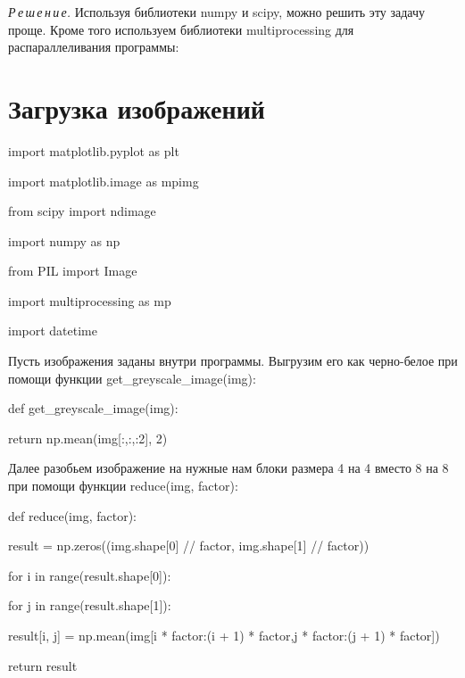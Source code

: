 \documentclass{article}
\begin{document}
 
\textit{Р\,е\,ш\,е\,н\,и\,е.}  Используя библиотеки numpy и scipy, можно решить эту задачу проще. Кроме того используем библиотеки multiprocessing для распараллеливания программы:

\section{Загрузка изображений}

{
\hspace{1cm}	import matplotlib.pyplot as plt
	
\hspace{1cm}	import matplotlib.image as mpimg
	
\hspace{1cm}	from scipy import ndimage
	
\hspace{1cm}	import numpy as np
	
\hspace{1cm}	from PIL import Image
	
\hspace{1cm}	import multiprocessing as mp
	
\hspace{1cm}	import datetime 

}
\vspace{1em}

Пусть изображения заданы внутри программы. Выгрузим его как черно-белое при помощи функции get\_greyscale\_image(img):
{

def get\_greyscale\_image(img):

\hspace{1cm}		return np.mean(img[:,:,:2], 2)
}
Далее разобьем изображение на нужные нам блоки размера 4 на 4 вместо 8 на 8 при помощи функции reduce(img, factor):
{

def reduce(img, factor):

\hspace{1cm}	result = np.zeros((img.shape[0] // factor, img.shape[1] // factor))

\hspace{1cm}	for i in range(result.shape[0]):

\hspace{2cm}		for j in range(result.shape[1]):

\hspace{3cm}			result[i, j] = np.mean(img[i * factor:(i + 1) * factor,j * factor:(j + 1) * factor])


\hspace{1cm}	return result
}
\vspace{1em}
\end{document}
